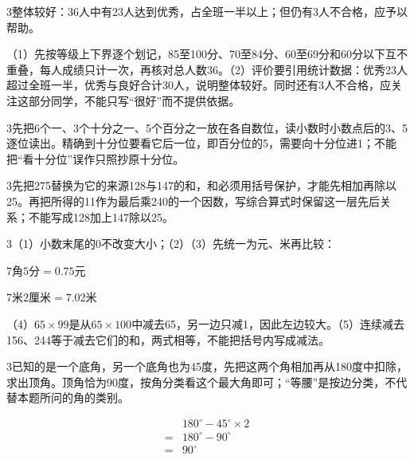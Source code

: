 \documentclass[multi=snippet,border={5bp 20bp 5bp 5bp}]{standalone}
\newenvironment{snippet}[3]{\begin{minipage}{#1bp}\color{answerred}\fontsize{#2}{#3}\selectfont\raggedright}{\end{minipage}}
\begin{document}
\begin{snippet}{505}{11.5}{14}\begin{multicols}{3}\raggedcolumns 整体较好：36人中有23人达到优秀，占全班一半以上；但仍有3人不合格，应予以帮助。\par （1）先按等级上下界逐个划记，85至100分、70至84分、60至69分和60分以下互不重叠，每人成绩只计一次，再核对总人数36。（2）评价要引用统计数据：优秀23人超过全班一半，优秀与良好合计30人，说明整体较好。同时还有3人不合格，应关注这部分同学，不能只写“很好”而不提供依据。\end{multicols}\end{snippet}
\begin{snippet}{505}{11.5}{14}\begin{multicols}{3}\raggedcolumns 先把6个一、3个十分之一、5个百分之一放在各自数位，读小数时小数点后的3、5逐位读出。精确到十分位要看它后一位，即百分位的5，需要向十分位进1；不能把“看十分位”误作只照抄原十分位。\end{multicols}\end{snippet}
\begin{snippet}{505}{11.5}{14}\begin{multicols}{3}\raggedcolumns 先把275替换为它的来源128与147的和，和必须用括号保护，才能先相加再除以25。再把所得的11作为最后乘240的一个因数，写综合算式时保留这一层先后关系；不能写成128加上147除以25。\end{multicols}\end{snippet}
\begin{snippet}{505}{11.5}{14}\begin{multicols}{3}\raggedcolumns （1）小数末尾的0不改变大小；（2）（3）先统一为元、米再比较：\par\noindent\(\displaystyle 7\text{角}5\text{分}=0.75\text{元}\)\allowbreak \par \noindent\(\displaystyle 7\text{米}2\text{厘米}=7.02\text{米}\)\allowbreak \par（4）\(65\times99\)\allowbreak 是从\(65\times100\)\allowbreak 中减去65，另一边只减1，因此左边较大。（5）连续减去156、244等于减去它们的和，两式相等，不能把括号内写成减法。\end{multicols}\end{snippet}
\begin{snippet}{505}{11.5}{14}\begin{multicols}{3}\raggedcolumns 已知的是一个底角，另一个底角也为45度，先把这两个角相加再从180度中扣除，求出顶角。顶角恰为90度，按角分类看这个最大角即可；“等腰”是按边分类，不代替本题所问的角的类别。\par \[\begin{aligned}&180^\circ-45^\circ\times2\\={}&180^\circ-90^\circ\\={}&90^\circ\end{aligned}\]\end{multicols}\end{snippet}
\end{document}
